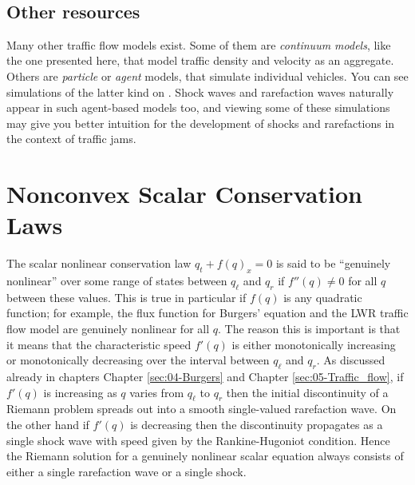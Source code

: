 \documentclass{SIAMbook2016}
\begin{document}
    \begin{center}
    \end{center}
    { \hspace*{\fill} \\}
    
\hypertarget{other-resources}{%
\section{Other resources}\label{other-resources}}

Many other traffic flow models exist. Some of them are \emph{continuum
models}, like the one presented here, that model traffic density and
velocity as an aggregate. Others are \emph{particle} or \emph{agent}
models, that simulate individual vehicles. You can see simulations of
the latter kind on
.
Shock waves and rarefaction waves naturally appear in such agent-based
models too, and viewing some of these simulations may give you better
intuition for the development of shocks and rarefactions in the context
of traffic jams.

\hypertarget{nonconvex-scalar-conservation-laws}{%
\chapter{Nonconvex Scalar Conservation
Laws}\label{nonconvex-scalar-conservation-laws}}
\label{sec:06-Nonconvex_scalar}


The scalar nonlinear conservation law \(q_t + f(q)_x = 0\) is said to be
``genuinely nonlinear'' over some range of states between \(q_\ell\) and
\(q_r\) if \(f''(q) \neq 0\) for all \(q\) between these values. This is
true in particular if \(f(q)\) is any quadratic function; for example,
the flux function for Burgers' equation and the LWR traffic flow model
are genuinely nonlinear for all \(q\). The reason this is important is
that it means that the characteristic speed \(f'(q)\) is either
monotonically increasing or monotonically decreasing over the interval
between \(q_\ell\) and \(q_r\). As discussed already in chapters
Chapter \ref{sec:04-Burgers} and Chapter \ref{sec:05-Traffic_flow}, if
\(f'(q)\) is increasing as \(q\) varies from \(q_\ell\) to \(q_r\) then
the initial discontinuity of a Riemann problem spreads out into a smooth
single-valued rarefaction wave. On the other hand if \(f'(q)\) is
decreasing then the discontinuity propagates as a single shock wave with
speed given by the Rankine-Hugoniot condition. Hence the Riemann
solution for a genuinely nonlinear scalar equation always consists of
either a single rarefaction wave or a single shock.
\end{document}
